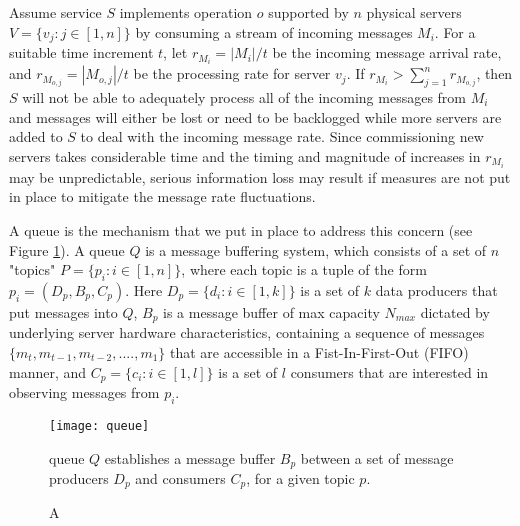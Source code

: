 Assume service $S$ implements operation $o$ supported by $n$ physical servers $V = \{v_j: j \in [1,n]\}$ by consuming a stream of incoming messages $M_i$. For a suitable time increment $t$, let $r_{M_i} = |M_i|/t$ be the incoming message arrival rate, and $r_{M_{o,j}} = |M_{o,j}|/t$ be the processing rate for server $v_j$. If $r_{M_i} > \sum_{j=1}^n r_{M_{o,j}}$, then $S$ will not be able to adequately process all of the incoming messages from $M_i$ and messages will either be lost or need to be backlogged while more servers are added to $S$ to deal with the incoming message rate. Since commissioning new servers takes considerable time and the timing and magnitude of increases in $r_{M_i}$ may be unpredictable, serious information loss may result if measures are not put in place to mitigate the message rate fluctuations. 

A queue is the mechanism that we put in place to address this concern (see Figure \ref{fig:queue}). A queue $Q$ is a message buffering system, which consists of a set of $n$ "topics" $P = \{p_i: i \in [1,n]\}$, where each topic is a tuple of the form $p_i = (D_p,B_p,C_p)$. Here $D_p = \{d_i: i\in [1,k]\}$ is a set of $k$ data producers that put messages into $Q$, $B_p$ is a message buffer of max capacity $N_{max}$ dictated by underlying server hardware characteristics, containing a sequence of messages $\{m_t, m_{t-1},m_{t-2},....,m_1\}$ that are accessible in a Fist-In-First-Out (FIFO) manner, and $C_p = \{c_i: i \in [1,l]\}$ is a set of $l$ consumers that are interested in observing messages from $p_i$.

\begin{figure}[H]
\texttt{[image: queue]}
\caption A queue $Q$ establishes a message buffer $B_p$ between a set of message producers $D_p$ and consumers $C_p$, for a given topic $p$.
\label{fig:queue}
\end{figure}

